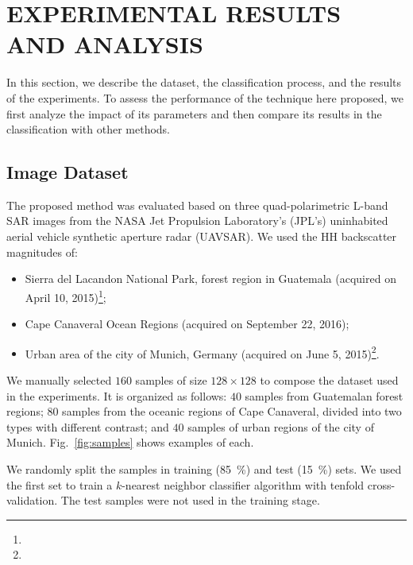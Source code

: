\documentclass[journal]{IEEEtran}
\begin{document}
	\section{EXPERIMENTAL RESULTS AND ANALYSIS}\label{Results}
	
	In this section, we describe the dataset, 
	the classification process, and 
	the results of the experiments.
	To assess the performance of the technique here proposed, we first analyze the impact of its parameters and then compare its results in the classification with other methods.
	
	\subsection{Image Dataset}
	
	The proposed method was evaluated based on three quad-polarimetric L-band SAR images from the NASA Jet Propulsion Laboratory’s (JPL’s) uninhabited aerial vehicle synthetic aperture radar (UAVSAR).
	We used the HH backscatter magnitudes of:
	\begin{itemize}
		\item Sierra del Lacandon National Park, forest region in Guatemala (acquired on April 10, 2015)\footnote{};
		\item Cape Canaveral Ocean Regions (acquired on September 22, 2016);
		\item Urban area of the city of Munich, Germany (acquired on June 5, 2015)\footnote{}.
	\end{itemize}
	
	We manually selected $160$ samples of size $128 \times 128$ to compose the dataset used in the experiments.
	It is organized as follows:
	$40$ samples from Guatemalan forest regions;
	$80$ samples from the oceanic regions of Cape Canaveral, divided into two types with different contrast; and
	$40$ samples of urban regions of the city of Munich.
	Fig.~\ref{fig:samples} shows examples of each.
	
	
	We randomly split the samples in training (\SI{85}{\percent}) and test (\SI{15}{\percent}) sets.
	We used the first set to train a $k$-nearest neighbor classifier algorithm with tenfold cross-validation.
	The test samples were not used in the training stage.
	
\end{document}
